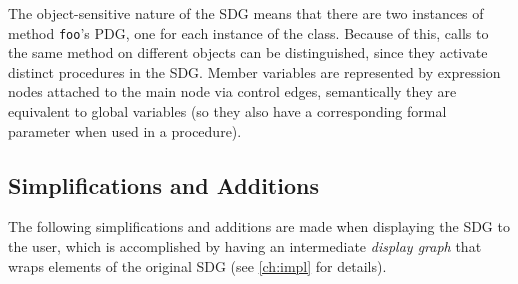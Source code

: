 The object-sensitive nature of the SDG means that there are two instances of method \lstinline|foo|'s PDG, one for each 
instance of the class. Because of this, calls to the same method on different objects can be distinguished, since they 
activate distinct procedures in the SDG. Member variables are represented by expression nodes attached to the main node 
via control edges, semantically they are equivalent to global variables (so they also have a corresponding formal 
parameter when used in a procedure).



\subsection{Simplifications and Additions}

The following simplifications and additions are made when displaying the SDG to the user, which is accomplished by 
having an intermediate \emph{display graph} that wraps elements of the original SDG (see \autoref{ch:impl} for details).


